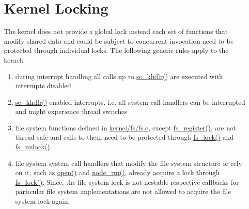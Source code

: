 %
%
%



\section{Kernel Locking}

The kernel does not provide a global lock instead each set of functions that modify shared data and could be subject to concurrent invocation need to be protected through individual locks. The following generic rules apply to the kernel:
\begin{enumerate}
	\item during interrupt handling all calls up to \hyperref[kernel_2syscall_8c_af76601a584a72bc6b7b9da599bbdd3c8]{sc\_khdlr()} are executed with interrupts disabled
	\item \hyperref[kernel_2syscall_8c_af76601a584a72bc6b7b9da599bbdd3c8]{sc\_khdlr()} enabled interrupts, i.e. all system call handlers can be interrupted and might experience thread switches
	\item file system functions defined in \hyperref[kernel_2fs_2fs_8c]{kernel/fs/fs.c}, except \hyperref[kernel_2fs_2fs_8c_a11ce2a4ca94ef9167c296a3788c466a5]{fs\_register()}, are not thread-safe and calls to them need to be protected through \hyperref[kernel_2fs_2fs_8c_a5d8afec6e07924b790d1de8c4b5e416a]{fs\_lock()} and \hyperref[kernel_2fs_2fs_8c_a6becda9de89bcff22da1b19436174d13]{fs\_unlock()}
	\item file system system call handlers that modify the file system structure or rely on it, such as \hyperref[structfs__ops__t_a0ea05ccab180719ed0f32631d5ad71bf]{open()} and \hyperref[structfs__ops__t_a91e4d28d725ec81e420a8c0daea50270]{node\_rm()}, already acquire a lock through \hyperref[kernel_2fs_2fs_8c_a5d8afec6e07924b790d1de8c4b5e416a]{fs\_lock()}. Since, the file system lock is not nestable respective callbacks for particular file system implementations are not allowed to acquire the file system lock again.
\end{enumerate}
